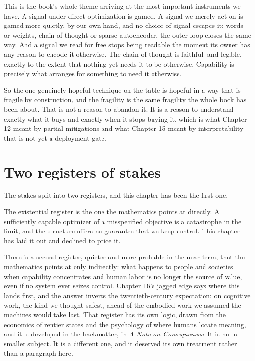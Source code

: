 This is the book's whole theme arriving at the most important instruments we have. A signal under direct optimization is gamed. A signal we merely act on is gamed more quietly, by our own hand, and no choice of signal escapes it: words or weights, chain of thought or sparse autoencoder, the outer loop closes the same way. And a signal we read for free stops being readable the moment its owner has any reason to encode it otherwise. The chain of thought is faithful, and legible, exactly to the extent that nothing yet needs it to be otherwise. Capability is precisely what arranges for something to need it otherwise.

So the one genuinely hopeful technique on the table is hopeful in a way that is fragile by construction, and the fragility is the same fragility the whole book has been about. That is not a reason to abandon it. It is a reason to understand exactly what it buys and exactly when it stops buying it, which is what Chapter 12 meant by partial mitigations and what Chapter 15 meant by interpretability that is not yet a deployment gate.

\section*{Two registers of stakes}

The stakes split into two registers, and this chapter has been the first one.

The existential register is the one the mathematics points at directly. A sufficiently capable optimizer of a misspecified objective is a catastrophe in the limit, and the structure offers no guarantee that we keep control. This chapter has laid it out and declined to price it.

There is a second register, quieter and more probable in the near term, that the mathematics points at only indirectly: what happens to people and societies when capability concentrates and human labor is no longer the source of value, even if no system ever seizes control. Chapter 16's jagged edge says where this lands first, and the answer inverts the twentieth-century expectation: on cognitive work, the kind we thought safest, ahead of the embodied work we assumed the machines would take last. That register has its own logic, drawn from the economics of rentier states and the psychology of where humans locate meaning, and it is developed in the backmatter, in \emph{A Note on Consequences}. It is not a smaller subject. It is a different one, and it deserved its own treatment rather than a paragraph here.

